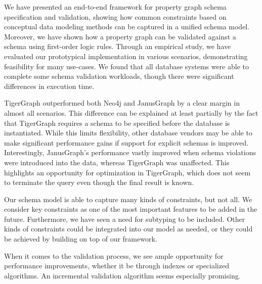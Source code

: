 \documentclass{report}
\theoremstyle{definition}
\begin{document}
We have presented an end-to-end framework for property graph schema specification and validation, showing how common constraints based on conceptual data modeling methods can be captured in a unified schema model. Moreover, we have shown how a property graph can be validated against a schema using first-order logic rules. Through an empirical study, we have evaluated our prototypical implementation in various scenarios, demonstrating feasibility for many use-cases. We found that all database systems were able to complete some schema validation workloads, though there were significant differences in execution time.

TigerGraph outperformed both Neo4j and JanusGraph by a clear margin in almost all scenarios. This difference can be explained at least partially by the fact that TigerGraph requires a schema to be specified before the database is instantiated. While this limits flexibility, other database vendors may be able to make significant performance gains if support for explicit schemas is improved. Interestingly, JanusGraph's performance vastly improved when schema violations were introduced into the data, whereas TigerGraph was unaffected. This highlights an opportunity for optimization in TigerGraph, which does not seem to terminate the query even though the final result is known.

Our schema model is able to capture many kinds of constraints, but not all. We consider key constraints as one of the most important features to be added in the future. Furthermore, we have seen a need for subtyping to be included. Other kinds of constraints could be integrated into our model as needed, or they could be achieved by building on top of our framework.

When it comes to the validation process, we see ample opportunity for performance improvements, whether it be through indexes or specialized algorithms. An incremental validation algorithm seems especially promising.


\end{document}

